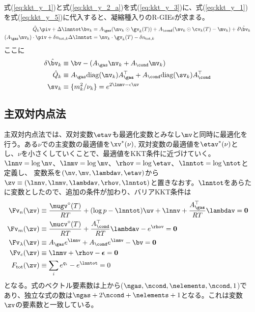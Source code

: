 式(\ref{eq:kkt_y_1})と式(\ref{eq:kkt_y_2_a})を式(\ref{eq:kkt_y_3})に、式(\ref{eq:kkt_y_1})を式(\ref{eq:kkt_y_5})に代入すると、凝縮種入りのR-GIEsが求まる。
\begin{align}
\label{eq:kkt_z_3}
\hat{Q}_k \piv + \Delta \lnntot \bv_k  &= A_\gas ( \nv_k \odot \gv_k (T) ) + A_\cond ( \sv_k \odot \cv_k (T) - \mv_k) + \delta \hat{\bv}_k \\
\label{eq:kkt_z_5}
(A_\gas \nv_k) \cdot \piv + \delta n_{\mathrm{tot}, k} \Delta \lnntot &= \nv_k \cdot \gv_k(T) - \delta n_{\mathrm{tot}, k}
 \end{align}
 ここに
\begin{align}
\delta \hat{\bv}_k &\equiv \bv - ( A_\gas \nv_k + A_\cond \mv_k) \\ 
\hat{Q}_k &\equiv A_\gas \mathrm{diag}(\nv_k) A_\gas^\top + A_\cond  \mathrm{diag}(\sv_k) A_\cond^\top \\
\sv_k &\equiv \{ m_k^2/\nu_k \} = e^{2 \lnmv - \epsilon \uv} 
\end{align}





\subsection*{主双対内点法}

主双対内点法では、双対変数$\etav$も最適化変数とみなし$\mv$と同時に最適化を行う。ある$\nu$での主変数の最適値を$\xv^\ast (\nu)$, 双対変数の最適値を$\etav^\ast (\nu)$とし、$\nu$を小さくしていくことで、最適値をKKT条件に近づけていく。
$\lnnv = \log{\nv}$、$\lnmv = \log{\mv}$、$\rhov = \log{\etav}$、$\lnntot = \log{\ntot}$と定義し、
変数系を$(\nv, \mv, \lambdav, \etav)$から$\zv \equiv (\lnnv, \lnmv, \lambdav, \rhov, \lnntot)$と置きなおす。$\lnntot$をあらたに変数としたので、追加の条件が加わり、バリアKKT条件は
\begin{align}
\label{eq:akkt1_d}
\Fv_n (\zv) &\equiv \frac{\mugv^\circ(T)}{RT} + (\log{p} - \lnntot) \uv + \lnnv +  \frac{A_\gas^\top}{R T} \lambdav = \boldsymbol{0}   \\
\label{eq:akkt2_d}
\Fv_m (\zv) &\equiv \frac{\mucv^\circ (T)}{RT} + \frac{A_\cond^\top}{R T} \lambdav - e^{\rhov} = \boldsymbol{0}   \\
\Fv_\lambda (\zv) &\equiv A_\gas e^{\lnnv} + A_\cond e^{\lnmv} - \bv = \boldsymbol{0} \\
\label{eq:akkt3_d}
\Fv_c (\zv) &\equiv \lnmv + \rhov - \boldsymbol{\epsilon} = \boldsymbol{0}\\
\label{eq:akkt4_d}
F_\mathrm{tot} (\zv) &\equiv \sum_i {e^{q_i}} - e^{\lnntot} = 0
\end{align}
となる。式のベクトル要素数は上から($\ngas, \ncond, \nelements, \ncond, 1$)であり、独立な式の数は$\ngas + 2 \ncond + \nelements + 1$となる。これは変数$\zv$の要素数と一致している。


